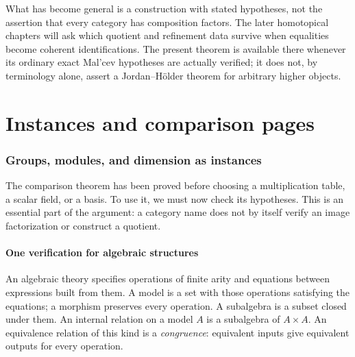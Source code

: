 \documentclass[11pt]{article}
\theoremstyle{definition}
\theoremstyle{remark}\newtheorem{remark}[theorem]{Remark}
\begin{document}
What has become general is a construction with stated hypotheses, not
the assertion that every category has composition factors.  The later
homotopical chapters will ask which quotient and refinement data survive
when equalities become coherent identifications.  The present theorem
is available there whenever its ordinary exact Mal'cev hypotheses are
actually verified; it does not, by terminology alone, assert a
Jordan--H\"older theorem for arbitrary higher objects.


\clearpage\part{Instances and comparison pages}

\section{Groups, modules, and dimension as instances}\label{e:section}

The comparison theorem has been proved before choosing a multiplication
table, a scalar field, or a basis. To use it, we must now check its hypotheses.
This is an essential part of the argument: a category name does not by itself
verify an image factorization or construct a quotient.

\subsection{One verification for algebraic structures}\label{e:varieties}

An algebraic theory specifies operations of finite arity and equations between
expressions built from them. A model is a set with those operations satisfying
the equations; a morphism preserves every operation. A subalgebra is a subset
closed under them. An internal relation on a model $A$ is a subalgebra of
$A\times A$. An equivalence relation of this kind is a \emph{congruence}:
equivalent inputs give equivalent outputs for every operation.
\end{document}
